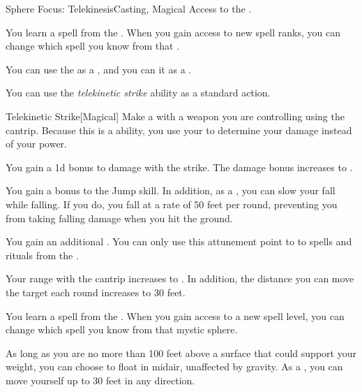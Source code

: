    \begin{feat}{Sphere Focus: Telekinesis}{Casting, Magical}
        \featpre Access to the  .

         You learn a spell from the  .
        When you gain access to new spell ranks, you can change which spell you know from that .

         You can use the   as a , and you can  it as a .

         You can use the \textit{telekinetic strike} ability as a standard action.
        \begin{freeability}{Telekinetic Strike}[Magical]
            Make a  with a weapon you are controlling using the  cantrip.
            Because this is a  ability, you use your   to determine your damage instead of your  power.

            \rankline
             You gain a \plus1d bonus to damage with the strike.
             The damage bonus increases to .
        \end{freeability}

         You gain a  bonus to the Jump skill.
        In addition, as a , you can slow your fall while falling.
        If you do, you fall at a rate of 50 feet per round, preventing you from taking falling damage when you hit the ground.

         You gain an additional .
        You can only use this attunement point to  to spells and rituals from the  .

         Your range with the  cantrip increases to \rngmed.
        In addition, the distance you can move the target each round increases to 30 feet.

         You learn a spell from the  .
        When you gain access to a new spell level, you can change which spell you know from that mystic sphere.

         As long as you are no more than 100 feet above a surface that could support your weight, you can choose to float in midair, unaffected by gravity.
        As a , you can move yourself up to 30 feet in any direction.
    \end{feat}


